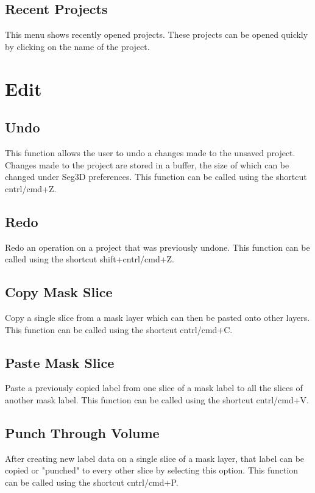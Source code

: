 \documentclass[fleqn,11pt,openany]{book}
\begin{document}
\subsection{Recent Projects}
This menu shows recently opened projects.  These projects can be opened quickly by clicking on the name of the project.

\section{Edit}

\subsection{Undo}
This function allows the user to undo a changes made to the unsaved project.  Changes made to the project are stored
in a buffer, the size of which can be changed under Seg3D preferences. This function can be called using the shortcut cntrl/cmd+Z.


\subsection{Redo}
Redo an operation on a project that was previously undone. This function can be called using the shortcut shift+cntrl/cmd+Z.


\subsection{Copy Mask Slice}
\label{sec:copy}
Copy a single slice from a mask layer which can then be pasted onto other layers. This function can be called using the shortcut cntrl/cmd+C.


\subsection{Paste Mask Slice}
\label{sec:paste}
Paste a previously copied label from one slice of a mask label to all the slices of another mask label. This function can be called using the shortcut cntrl/cmd+V.


\subsection{Punch Through Volume}
\label{sec:punch}
After creating new label data on a single slice of a mask layer, that label can be copied or "punched" to every other slice by
selecting this option. This function can be called using the shortcut cntrl/cmd+P.
\end{document}
